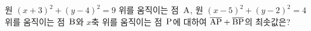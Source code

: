 원 $(x+3)^2+(y-4)^2=9$ 위를 움직이는 점~$\mathrm{A}$, 원 $(x-5)^2+(y-2)^2=4$ 위를 움직이는 점~$\mathrm{B}$와 $x$축 위를 움직이는 점~$\mathrm{P}$에 대하여 $\overline{\mathrm{AP}}+\overline{\mathrm{BP}}$의 최솟값은?
